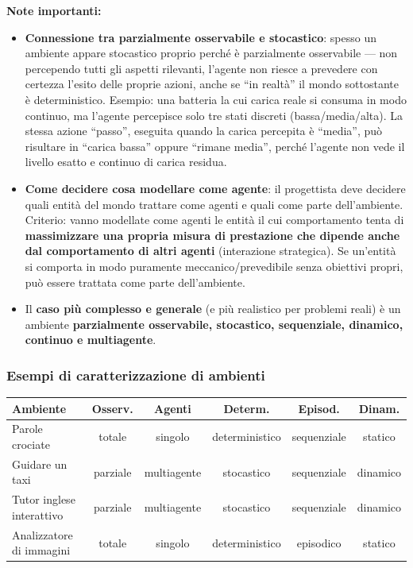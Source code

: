 \documentclass[11pt,a4paper]{report}
\begin{document}
\textbf{Note importanti:}
\begin{itemize}
  \item \textbf{Connessione tra parzialmente osservabile e stocastico}: spesso un ambiente appare stocastico proprio perché è parzialmente osservabile --- non percependo tutti gli aspetti rilevanti, l'agente non riesce a prevedere con certezza l'esito delle proprie azioni, anche se ``in realtà'' il mondo sottostante è deterministico. Esempio: una batteria la cui carica reale si consuma in modo continuo, ma l'agente percepisce solo tre stati discreti (bassa/media/alta). La stessa azione ``passo'', eseguita quando la carica percepita è ``media'', può risultare in ``carica bassa'' oppure ``rimane media'', perché l'agente non vede il livello esatto e continuo di carica residua.
  \item \textbf{Come decidere cosa modellare come agente}: il progettista deve decidere quali entità del mondo trattare come agenti e quali come parte dell'ambiente. Criterio: vanno modellate come agenti le entità il cui comportamento tenta di \textbf{massimizzare una propria misura di prestazione che dipende anche dal comportamento di altri agenti} (interazione strategica). Se un'entità si comporta in modo puramente meccanico/prevedibile senza obiettivi propri, può essere trattata come parte dell'ambiente.
  \item Il \textbf{caso più complesso e generale} (e più realistico per problemi reali) è un ambiente \textbf{parzialmente osservabile, stocastico, sequenziale, dinamico, continuo e multiagente}.
\end{itemize}

\subsubsection*{Esempi di caratterizzazione di ambienti}

\begin{center}
\small
\begin{tabular}{@{}lccccc@{}}
\toprule
\textbf{Ambiente} & \textbf{Osserv.} & \textbf{Agenti} & \textbf{Determ.} & \textbf{Episod.} & \textbf{Dinam.} \\
\midrule
Parole crociate & totale & singolo & deterministico & sequenziale & statico \\
Guidare un taxi & parziale & multiagente & stocastico & sequenziale & dinamico \\
Tutor inglese interattivo & parziale & multiagente & stocastico & sequenziale & dinamico \\
Analizzatore di immagini & totale & singolo & deterministico & episodico & statico \\
\bottomrule
\end{tabular}
\normalsize
\end{center}
\end{document}
